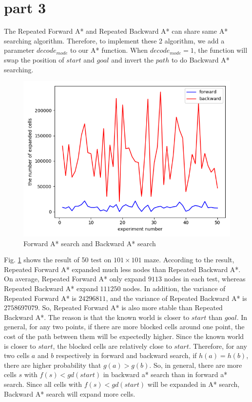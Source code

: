 \documentclass[11pt]{article}
\begin{document}
\section*{part 3}
The Repeated Forward A* and Repeated Backward A* can share same A* searching algorithm. Therefore, to implement these 2 algorithm, we add a parameter $decode_{mode}$ to our A* function. When $decode_{mode} = 1$, the function will swap the position of $start$ and $goal$ and invert the $path$ to do Backward A* searching.
	\begin{figure}[htb]
		\centering
		\includegraphics[scale = 0.3]{forward_backward.png}
		\caption{Forward A* search and Backward A* search}
		\label{fig:Fig3.F&B}
	\end{figure}
\newline
Fig. \ref{fig:Fig3.F&B} shows the result of 50 test on $101\times 101$ maze. According to the  result, Repeated Forward A* expanded much less  nodes than Repeated Backward A*. On average, Repeated Forward A* only expand $9113$ nodes in each test, whereas Repeated Backward A* expand $111250$ nodes. In addition, the variance of Repeated Forward A* is $24296811$, and the variance of Repeated Backward A* is $2758697079$. So, Repeated Forward A* is also more stable than Repeated Backward A*.
\newline
The reason is that the known world is closer to $start$ than $goal$. In general, for any two points, if there are more blocked cells around one point, the cost of the path between them will be expectedly higher. Since the known world is closer to $start$, the blocked cells are relatively close to $start$. Therefore, for any two cells $a$ and $b$ respectively in forward and backward search, if $h(a) = h(b)$, there are higher probability that $g(a) > g(b)$. So, in general, there are more cells $s$ with $f(s) < gd(start)$ in backward a* search than in forward a* search. Since all cells with $f(s) < gd(start)$ will be expanded in A* search, Backward A* search will expand more cells.
\end{document}
